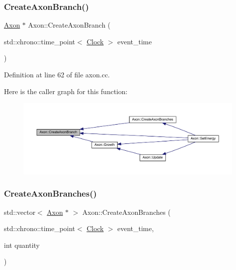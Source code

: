 \subsubsection{\texorpdfstring{Create\+Axon\+Branch()}{CreateAxonBranch()}}
{\footnotesize\ttfamily \hyperlink{class_axon}{Axon} $\ast$ Axon\+::\+Create\+Axon\+Branch (\begin{DoxyParamCaption}\item[{std\+::chrono\+::time\+\_\+point$<$ \hyperlink{universe_8h_a0ef8d951d1ca5ab3cfaf7ab4c7a6fd80}{Clock} $>$}]{event\+\_\+time }\end{DoxyParamCaption})}



Definition at line 62 of file axon.\+cc.

Here is the caller graph for this function\+:
\nopagebreak
\begin{figure}[H]
\begin{center}
\leavevmode
\includegraphics[width=350pt]{class_axon_a41e97ead4c793003db2de87061574c26_icgraph}
\end{center}
\end{figure}
\mbox{\label{class_axon_ab0da51c05a0879efdb45c594b68ef8fd}} 
\subsubsection{\texorpdfstring{Create\+Axon\+Branches()}{CreateAxonBranches()}}
{\footnotesize\ttfamily std\+::vector$<$ \hyperlink{class_axon}{Axon} $\ast$ $>$ Axon\+::\+Create\+Axon\+Branches (\begin{DoxyParamCaption}\item[{std\+::chrono\+::time\+\_\+point$<$ \hyperlink{universe_8h_a0ef8d951d1ca5ab3cfaf7ab4c7a6fd80}{Clock} $>$}]{event\+\_\+time,  }\item[{int}]{quantity }\end{DoxyParamCaption})}



